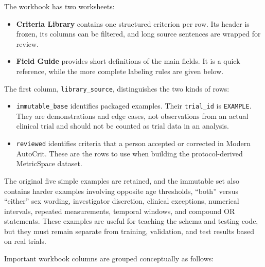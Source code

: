 \documentclass[11pt]{article}
\newcommand{\code}[1]{\texttt{#1}}
\begin{document}
The workbook has two worksheets:

\begin{itemize}
    \item \textbf{Criteria Library} contains one structured criterion per row. Its header is frozen, its columns can be filtered, and long source sentences are wrapped for review.
    \item \textbf{Field Guide} provides short definitions of the main fields. It is a quick reference, while the more complete labeling rules are given below.
\end{itemize}

The first column, \code{library\_source}, distinguishes the two kinds of rows:

\begin{itemize}
    \item \code{immutable\_base} identifies packaged examples. Their \code{trial\_id} is \code{EXAMPLE}. They are demonstrations and edge cases, not observations from an actual clinical trial and should not be counted as trial data in an analysis.
    \item \code{reviewed} identifies criteria that a person accepted or corrected in Modern AutoCrit. These are the rows to use when building the protocol-derived MetricSpace dataset.
\end{itemize}

The original five simple examples are retained, and the immutable set also contains harder examples involving opposite age thresholds, ``both'' versus ``either'' sex wording, investigator discretion, clinical exceptions, numerical intervals, repeated measurements, temporal windows, and compound OR statements. These examples are useful for teaching the schema and testing code, but they must remain separate from training, validation, and test results based on real trials.

Important workbook columns are grouped conceptually as follows:
\end{document}
